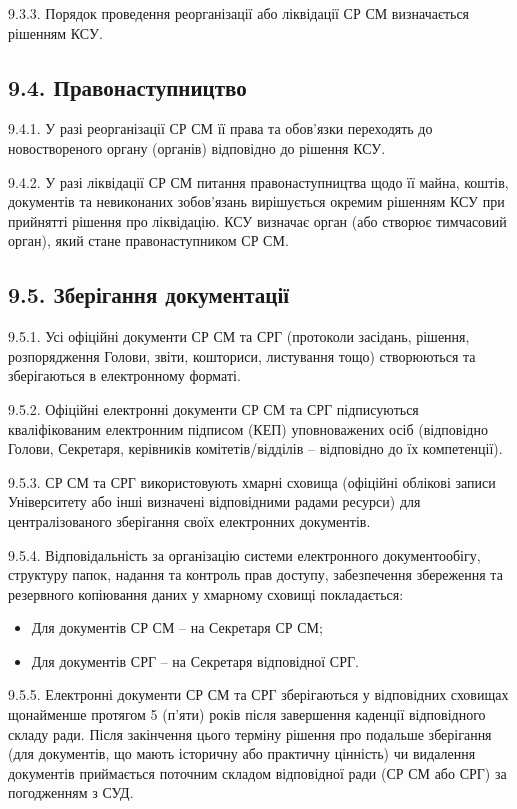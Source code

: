     9.3.3. Порядок проведення реорганізації або ліквідації СР СМ визначається рішенням КСУ.

\subsection*{9.4. Правонаступництво}
    9.4.1. У разі реорганізації СР СМ її права та обов'язки переходять до новоствореного органу (органів) відповідно до рішення КСУ.

    9.4.2. У разі ліквідації СР СМ питання правонаступництва щодо її майна, коштів, документів та невиконаних зобов'язань вирішується окремим рішенням КСУ при прийнятті рішення про ліквідацію. КСУ визначає орган (або створює тимчасовий орган), який стане правонаступником СР СМ.

\subsection*{9.5. Зберігання документації}
    9.5.1. Усі офіційні документи СР СМ та СРГ (протоколи засідань, рішення, розпорядження Голови, звіти, кошториси, листування тощо) створюються та зберігаються в електронному форматі.

    9.5.2. Офіційні електронні документи СР СМ та СРГ підписуються кваліфікованим електронним підписом (КЕП) уповноважених осіб (відповідно Голови, Секретаря, керівників комітетів/відділів – відповідно до їх компетенції).

    9.5.3. СР СМ та СРГ використовують хмарні сховища (офіційні облікові записи Університету або інші визначені відповідними радами ресурси) для централізованого зберігання своїх електронних документів.

    9.5.4. Відповідальність за організацію системи електронного документообігу, структуру папок, надання та контроль прав доступу, забезпечення збереження та резервного копіювання даних у хмарному сховищі покладається:

        \begin{itemize}
            \item Для документів СР СМ – на Секретаря СР СМ;
            \item Для документів СРГ – на Секретаря відповідної СРГ.
        \end{itemize}
    9.5.5. Електронні документи СР СМ та СРГ зберігаються у відповідних сховищах щонайменше протягом 5 (п'яти) років після завершення каденції відповідного складу ради. Після закінчення цього терміну рішення про подальше зберігання (для документів, що мають історичну або практичну цінність) чи видалення документів приймається поточним складом відповідної ради (СР СМ або СРГ) за погодженням з СУД.
